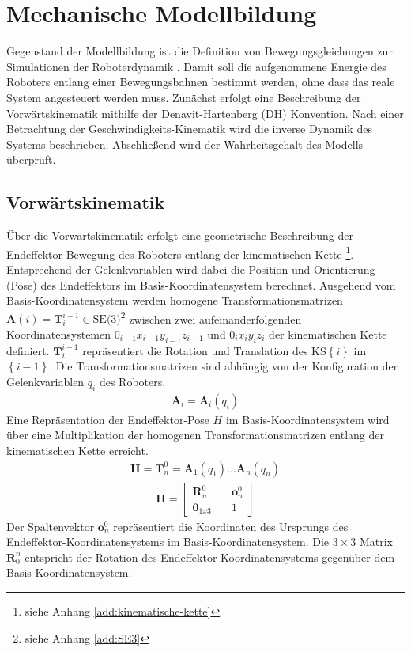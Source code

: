 \chapter{Mechanische Modellbildung}
%
Gegenstand der Modellbildung ist die Definition von Bewegungsgleichungen zur Simulationen der Roboterdynamik \cite[S.~247]{Grimble.2009}. Damit soll die aufgenommene Energie des Roboters entlang einer Bewegungsbahnen bestimmt werden, ohne dass das reale System angesteuert werden muss. Zunächst erfolgt eine Beschreibung der Vorwärtskinematik mithilfe der Denavit-Hartenberg (DH) Konvention. Nach einer Betrachtung der Geschwindigkeits-Kinematik wird die inverse Dynamik des Systems beschrieben.  Abschließend wird der Wahrheitsgehalt des Modells überprüft.

\section{Vorwärtskinematik}
Über die Vorwärtskinematik erfolgt eine geometrische Beschreibung der Endeffektor Bewegung des Roboters entlang der kinematischen Kette \footnote{siehe Anhang \ref{add:kinematische-kette}}. Entsprechend der Gelenkvariablen wird dabei die Position und Orientierung (Pose) des Endeffektors im Basis-Koordinatensystem berechnet. Ausgehend vom Basis-Koordinatensystem werden homogene Transformationsmatrizen $\bm{A}(i) = \bm{T}^{i-1}_i \in \text{SE(3)}$\footnote{siehe Anhang \ref{add:SE3}} zwischen zwei aufeinanderfolgenden Koordinatensystemen $0_{i-1}x_{i-1}y_{i-1}z_{i-1}$ und $0_ix_iy_iz_i$ der kinematischen Kette definiert. $\bm{T}^{i-1}_i$ repräsentiert die  Rotation und Translation des KS$\left\{i\right\}$ im $\left\{i-1\right\}$. Die Transformationsmatrizen sind abhängig von der Konfiguration der Gelenkvariablen $q_i$ des Roboters. 
\begin{align}
	\bm{A}_i = \bm{A}_i(q_i)
\end{align}
Eine Repräsentation der Endeffektor-Pose $H$ im Basis-Koordinatensystem wird über eine Multiplikation der homogenen Transformationsmatrizen entlang der kinematischen Kette erreicht. 
\begin{align}
	\label{eqn:homogeneTransformation}
	\bm{H} = \bm{T}^0_n = \bm{A}_1(q_1) ... \bm{A}_n(q_n)
\end{align}
\begin{align}
	\bm{H} =\begin{bmatrix} \bm{R}^0_n &\quad \bm{o}^0_n\\ \mathbf{0}_{1x3} &\quad 1\end{bmatrix}
\end{align}
Der Spaltenvektor $\bm{o}^0_n$ repräsentiert die Koordinaten des Ursprungs des Endeffektor-Koordinatensystems im Basis-Koordinatensystem. Die $3 \times 3 $ Matrix $\bm{R}^n_0$ entspricht der Rotation des Endeffektor-Koordinatensystems gegenüber dem Basis-Koordinatensystem. \cite[S.~75~ff.]{Spong.2020} 
%
